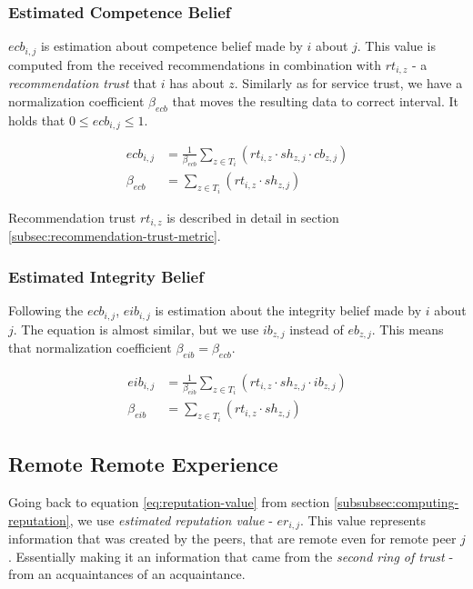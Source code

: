 \subsubsection{Estimated Competence Belief}
$ecb_{i,j}$ is estimation about competence belief made by $i$ about $j$. 
This value is computed from the received recommendations in combination with $rt_{i,z}$ - a \textit{recommendation trust} that $i$ has about $z$.
Similarly as for service trust, we have a normalization coefficient $\beta_{ecb}$ that moves the resulting data to correct interval.
It holds that $0 \leq ecb_{i,j} \leq 1$.

\begin{equation}
\label{eq:estimated-competence-belief}
\begin{split}
    ecb_{i,j} &= \frac{1}{\beta_{ecb}} \sum_{z \in T_{i}} \left(rt_{i, z} \cdot sh_{z, j} \cdot cb_{z, j}\right) \\
    \beta_{ecb} &= \sum_{z \in T_{i}} \left(rt_{i, z} \cdot sh_{z, j}\right)
\end{split}
\end{equation}

\noindent
Recommendation trust $rt_{i, z}$ is described in detail in section \ref{subsec:recommendation-trust-metric}.

\subsubsection{Estimated Integrity Belief}
Following the $ecb_{i,j}$, $eib_{i,j}$ is estimation about the integrity belief made by $i$ about $j$.
The equation is almost similar, but we use $ib_{z,j}$ instead of $eb_{z,j}$.
This means that normalization coefficient $\beta_{eib} = \beta_{ecb}$.

\begin{equation}
\label{eq:estimated-integrity-belief}
\begin{split}
    eib_{i,j} &= \frac{1}{\beta_{eib}} \sum_{z \in T_{i}} \left(rt_{i, z} \cdot sh_{z, j} \cdot ib_{z, j}\right) \\
    \beta_{eib} &= \sum_{z \in T_{i}} \left(rt_{i, z} \cdot sh_{z, j}\right)
\end{split}
\end{equation}

\subsection{Remote Remote Experience}
Going back to equation \ref{eq:reputation-value} from section \ref{subsubsec:computing-reputation}, we use \textit{estimated reputation value} - $er_{i,j}$.
This value represents information that was created by the peers, that are remote even for remote peer $j$. 
Essentially making it an information that came from the \textit{second ring of trust} - from an acquaintances of an acquaintance.

